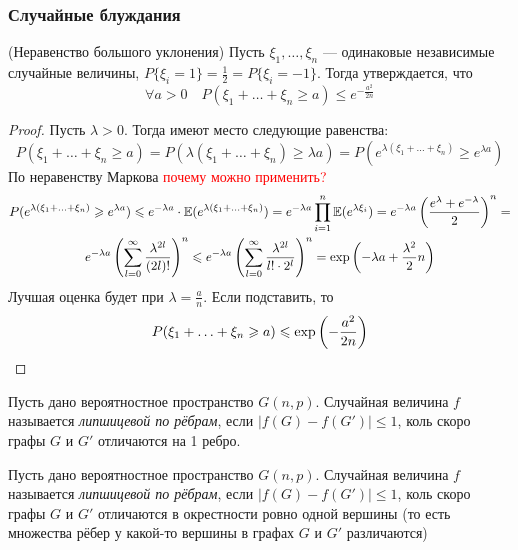 \subsubsection{Случайные блуждания}

\begin{theorem} (Неравенство большого уклонения)
	Пусть $\xi_1, \ldots, \xi_n$ --- одинаковые независимые случайные величины, $P\{\xi_i = 1\} = \frac{1}{2} = P\{\xi_i = -1\}$. Тогда утверждается, что
	\[
		\forall a > 0 \quad P(\xi_1 + \ldots + \xi_n \ge a) \le e^{-\frac{a^2}{2n}}
	\]
\end{theorem}

\begin{proof}
	Пусть $\lambda > 0$. Тогда имеют место следующие равенства:
	\[
		P(\xi_1 + \ldots + \xi_n \ge a) = P(\lambda(\xi_1 + \ldots + \xi_n) \ge \lambda a) = P(e^{\lambda (\xi_1 + \ldots + \xi_n)} \ge e^{\lambda a})
	\]
	По неравенству Маркова \textcolor{red}{почему можно применить?}
	\begin{multline*}
		P(e^{\lambda (\xi_1 + \ldots + \xi_n)} \geqslant e^{\lambda a}) \leqslant e^{-\lambda a} \cdot \mathbb{E}(e^{\lambda(\xi_1 + \ldots + \xi_n)}) = e^{-\lambda a} \prod_{i = 1}^n \mathbb{E}(e^{\lambda \xi_i}) = e^{-\lambda a} \left(\frac{e^\lambda + e^{-\lambda}}{2}\right)^n =
		\\
		e^{-\lambda a} \left(\sum_{l = 0}^\infty \frac{\lambda^{2l}}{(2l)!}\right)^n \leqslant e^{-\lambda a} \left(\sum_{l = 0}^\infty \frac{\lambda^{2l}}{l! \cdot 2^l}\right)^n = \exp\left(-\lambda a + \frac{\lambda^2}{2}n\right)
	\end{multline*}
	Лучшая оценка будет при $\lambda = \frac{a}{n}$. Если подставить, то
	\[
		P(\xi_1 + \ldots + \xi_n \geqslant a) \leqslant \exp\left(-\frac{a^2}{2n}\right)
	\]
\end{proof}

\begin{definition}
	Пусть дано вероятностное пространство $G(n, p)$. Случайная величина $f$ называется \textit{липшицевой по рёбрам}, если $|f(G) - f(G')| \le 1$, коль скоро графы $G$ и $G'$ отличаются на 1 ребро.
\end{definition}

\begin{definition}
	Пусть дано вероятностное пространство $G(n, p)$. Случайная величина $f$ называется \textit{липшицевой по рёбрам}, если $|f(G) - f(G')| \le 1$, коль скоро графы $G$ и $G'$ отличаются в окрестности ровно одной вершины (то есть множества рёбер у какой-то вершины в графах $G$ и $G'$ различаются)
\end{definition}

